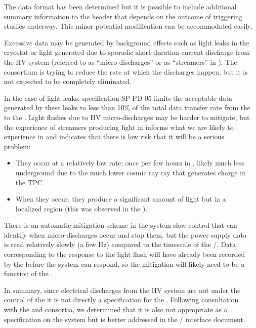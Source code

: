 The data format has been determined but it is possible to include additional summary information to the header that depends on the outcome of triggering studies underway. This minor potential modification can be accommodated easily.


Excessive  data may be generated by background effects such as light leaks in the cryostat or light generated due to sporadic short duration current discharge from the HV system (referred to as ``micro-discharges'' or as ``streamers'' in ).  The  consortium is trying to reduce the rate at which the discharges happen, but it is not expected to be completely eliminated. 

In the case of light leaks, specification SP-PD-05 limits the acceptable data generated by these leaks to  less than 10\% of the total data transfer rate from the  to the .
Light flashes due to HV micro-discharges may be harder to mitigate, but the experience of streamers producing light in  informs what we are likely to experience in  and indicates that there is low risk that it will be a serious problem:

\begin{itemize}
  
\item They occur at a relatively low rate: once per few hours in , likely much less underground due to the much lower cosmic ray ray that generates charge in the TPC.

\item When they occur, they produce a significant amount of light but in a localized region (this was observed in the  ).

\end{itemize}

There is an automatic mitigation scheme in the  system slow control that can identify when micro-discharges occur and stop them, but the power supply data is read relatively slowly (a few Hz) compared to the timescale of the /. Data corresponding to the  response to the light flash will have already been recorded by the  before the  system can respond, so the mitigation will likely need to be a function of the .

In summary, since electrical discharges from the HV system are not under the control of the  it is not directly a specification for the .  
Following consultation with the  and  consortia, we determined that it is also not appropriate as a specification on the  system but is better addressed in the / interface document.


